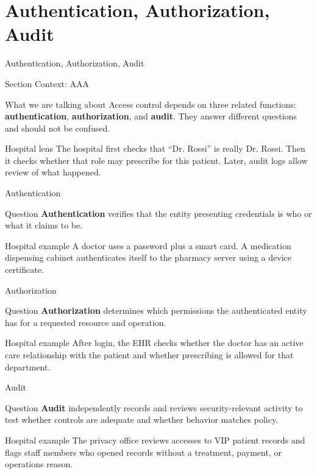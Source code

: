 \documentclass[presentation]{beamer}
\newcommand{\sectiontitleframe}[1]{
\begin{frame}[plain,c]
\begin{center}
{\usebeamerfont{title}\usebeamercolor[fg]{title}#1}
\end{center}
\end{frame}
}
\begin{document}
\section{Authentication, Authorization, Audit}
\sectiontitleframe{Authentication, Authorization, Audit}

\begin{frame}[c]{Section Context: AAA}
\begin{block}{What we are talking about}
Access control depends on three related functions: \textbf{authentication}, \textbf{authorization},
and \textbf{audit}. They answer different questions and should not be confused.
\end{block}

\begin{exampleblock}{Hospital lens}
The hospital first checks that ``Dr. Rossi'' is really Dr. Rossi. Then it checks whether that role
may prescribe for this patient. Later, audit logs allow review of what happened.
\end{exampleblock}
\end{frame}

\begin{frame}[c]{Authentication}
\begin{block}{Question}
\textbf{Authentication} verifies that the entity presenting credentials is who or what it claims to
be.
\end{block}

\begin{exampleblock}{Hospital example}
A doctor uses a password plus a smart card. A medication dispensing cabinet authenticates itself to
the pharmacy server using a device certificate.
\end{exampleblock}
\end{frame}

\begin{frame}[c]{Authorization}
\begin{block}{Question}
\textbf{Authorization} determines which permissions the authenticated entity has for a requested
resource and operation.
\end{block}

\begin{exampleblock}{Hospital example}
After login, the EHR checks whether the doctor has an active care relationship with the patient and
whether prescribing is allowed for that department.
\end{exampleblock}
\end{frame}

\begin{frame}[c]{Audit}
\begin{block}{Question}
\textbf{Audit} independently records and reviews security-relevant activity to test whether controls
are adequate and whether behavior matches policy.
\end{block}

\begin{exampleblock}{Hospital example}
The privacy office reviews accesses to VIP patient records and flags staff members who opened
records without a treatment, payment, or operations reason.
\end{exampleblock}
\end{frame}
\end{document}
